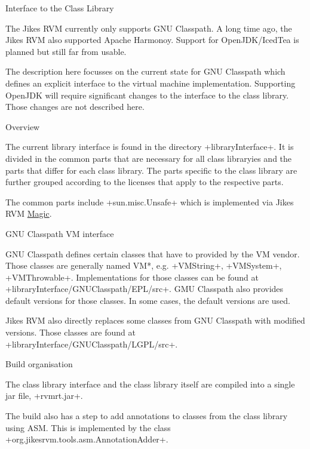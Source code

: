 \begin{chapter}{Interface to the Class Library}
\label{cha:classlibraryinterface}

The Jikes RVM currently only supports GNU Classpath. A long time ago, the Jikes RVM also supported Apache Harmonoy. Support for OpenJDK/IcedTea is planned but still far from usable.

The description here focusses on the current state for GNU Classpath which defines an explicit interface to the virtual machine implementation. Supporting OpenJDK will require significant changes to the interface to the class library. Those changes are not described here.

\begin{section}{Overview}

The current library interface is found in the directory \spverb+libraryInterface+. It is divided in the common parts that are necessary for all class libraryies and the parts that differ for each class library. The parts specific to the class library are further grouped according to the licenses that apply to the respective parts.

The common parts include \spverb+sun.misc.Unsafe+ which is implemented via Jikes RVM \hyperref[cha:magic]{Magic}.

\end{section}

\begin{section}{GNU Classpath VM interface}

GNU Classpath defines certain classes that have to provided by the VM vendor. Those classes are generally named VM*, e.g. \spverb+VMString+, \spverb+VMSystem+, \spverb+VMThrowable+. Implementations for those classes can be found at \newline \spverb+libraryInterface/GNUClasspath/EPL/src+. GMU Classpath also provides default versions for those classes. In some cases, the default versions are used.

Jikes RVM also directly replaces some classes from GNU Classpath with modified versions. Those classes are found at \newline \spverb+libraryInterface/GNUClasspath/LGPL/src+.

\end{section}

\begin{section}{Build organisation}

The class library interface and the class library itself are compiled into a single jar file, \spverb+rvmrt.jar+.

The build also has a step to add annotations to classes from the class library using ASM. This is implemented by the class \spverb+org.jikesrvm.tools.asm.AnnotationAdder+.

\end{section}


\end{chapter}
